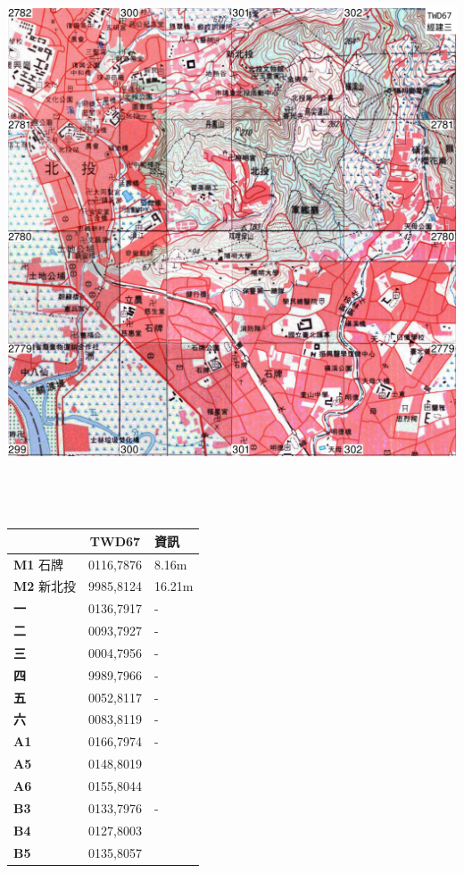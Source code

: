 \documentclass{article}
\begin{document}
\begin{CJK*}{UTF8}{bkai}
\begin{multicols}{2}
\includegraphics[width=20.73cm, height=16.58cm]{v3.png}
\begin{tabular}{|l|c|l|}
	\hline
	&TWD67&資訊\\  
	\hline
	\textbf{M1} 石牌&0116,7876&8.16m\\
	\textbf{M2} 新北投&9985,8124&16.21m\\
	\hline
	\textbf{一}&0136,7917&-\\
	\textbf{二}&0093,7927&-\\
	\textbf{三}&0004,7956&-\\
	\textbf{四}&9989,7966&-\\
	\textbf{五}&0052,8117&-\\
	\textbf{六}&0083,8119&-\\
	\hline
	\textbf{A1}&0166,7974&-\\
	\textbf{A5}&0148,8019&\\
	\textbf{A6}&0155,8044& \\
	\hline
	\textbf{B3}&0133,7976&-\\
	\textbf{B4}&0127,8003&\\
	\textbf{B5}&0135,8057&\\

\end{tabular}
\end{multicols}
\end{CJK*}
\end{document}
